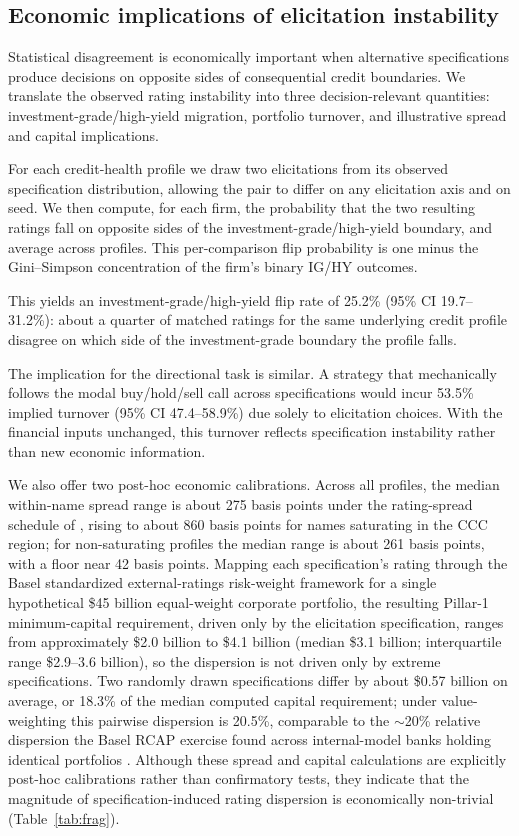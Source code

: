 \documentclass[a4paper,fleqn]{cas-sc}
\begin{document}
\subsection{Economic implications of elicitation instability}
Statistical disagreement is economically important when alternative specifications produce decisions on
opposite sides of consequential credit boundaries. We translate the observed rating instability into
three decision-relevant quantities: investment-grade/high-yield migration, portfolio turnover, and
illustrative spread and capital implications.

For each credit-health profile we draw two elicitations from its observed specification distribution,
allowing the pair to differ on any elicitation axis and on seed. We then compute, for each firm, the
probability that the two resulting ratings fall on opposite sides of the investment-grade/high-yield
boundary, and average across profiles. This per-comparison flip probability is one minus the
Gini--Simpson concentration of the firm's binary IG/HY outcomes.

This yields an investment-grade/high-yield flip rate of 25.2\% (95\% CI 19.7--31.2\%): about a quarter of
matched ratings for the same underlying credit profile disagree on which side of the investment-grade
boundary the profile falls.

The implication for the directional task is similar. A strategy that mechanically follows the modal
buy/hold/sell call across specifications would incur 53.5\% implied turnover (95\% CI 47.4--58.9\%) due
solely to elicitation choices. With the financial inputs unchanged, this turnover reflects specification
instability rather than new economic information.

We also offer two post-hoc economic calibrations. Across all profiles, the median within-name spread
range is about 275 basis points under the rating-spread schedule of \citet{cornaggia2018}, rising to
about 860 basis points for names saturating in the CCC region; for non-saturating profiles the median
range is about 261 basis points, with a floor near 42 basis points. Mapping each specification's rating
through the Basel standardized external-ratings risk-weight framework \citep{bcbs2019cre20} for a single
hypothetical \$45 billion equal-weight corporate portfolio, the resulting Pillar-1 minimum-capital
requirement, driven only by the elicitation specification, ranges from approximately \$2.0 billion to
\$4.1 billion (median \$3.1 billion; interquartile range \$2.9--3.6 billion), so the dispersion is not
driven only by extreme specifications. Two randomly drawn specifications differ by about \$0.57 billion on
average, or 18.3\% of the median computed capital requirement; under value-weighting this pairwise
dispersion is 20.5\%, comparable to the $\sim$20\% relative dispersion the Basel RCAP exercise found
across internal-model banks holding identical portfolios \citep{bcbs2013rcap}. Although these spread and
capital calculations are explicitly post-hoc calibrations rather than confirmatory tests, they indicate
that the magnitude of specification-induced rating dispersion is economically non-trivial
(Table~\ref{tab:frag}).
\end{document}
